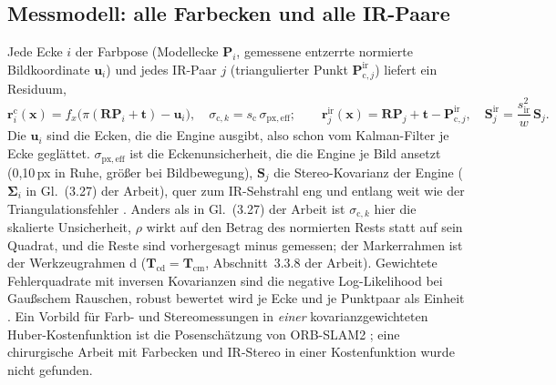 \documentclass[11pt,a4paper,fleqn]{article}
\newcommand{\Tcm}{\mathbf{T}_{\mathrm{cm}}}
\newcommand{\Pir}{\mathbf{P}^{\mathrm{ir}}_{\mathrm{c},j}}
\newcommand{\Sir}{\mathbf{S}^{\mathrm{ir}}_{j}}
\newcommand{\spx}{\sigma_{\mathrm{px,eff}}}
\begin{document}
\subsection{Messmodell: alle Farbecken und alle IR-Paare}

Jede Ecke $i$ der Farbpose (Modellecke $\mathbf{P}_i$, gemessene entzerrte normierte Bildkoordinate
$\mathbf{u}_i$) und jedes IR-Paar $j$ (triangulierter Punkt $\Pir$) liefert ein Residuum,
\begin{equation}
  \mathbf{r}^{\mathrm{c}}_i(\mathbf{x}) = f_x\bigl(\pi(\mathbf{R}\mathbf{P}_i + \mathbf{t}) - \mathbf{u}_i\bigr),
  \quad \sigma_{\mathrm{c},k} = s_{\mathrm{c}}\,\spx;
  \qquad
  \mathbf{r}^{\mathrm{ir}}_j(\mathbf{x}) = \mathbf{R}\mathbf{P}_j + \mathbf{t} - \Pir,
  \quad \Sir = \frac{s_{\mathrm{ir}}^2}{w}\,\mathbf{S}_j .
  \label{eq:meas}
\end{equation}
Die $\mathbf{u}_i$ sind die Ecken, die die Engine ausgibt, also schon vom Kalman-Filter je Ecke geglättet. $\spx$
ist die Eckenunsicherheit, die die Engine je Bild ansetzt (0,10\,px in Ruhe, größer bei Bildbewegung),
$\mathbf{S}_j$ die Stereo-Kovarianz der Engine ($\boldsymbol{\Sigma}_i$ in Gl.~(3.27) der Arbeit), quer zum
IR-Sehstrahl eng und entlang weit wie der Triangulationsfehler \cite[§II]{matthies1987error}. Anders als in
Gl.~(3.27) der Arbeit ist $\sigma_{\mathrm{c},k}$ hier die skalierte Unsicherheit, $\rho$ wirkt auf den Betrag des
normierten Rests statt auf sein Quadrat, und die Reste sind vorhergesagt minus gemessen; der Markerrahmen ist der
Werkzeugrahmen d ($\mathbf{T}_{\mathrm{cd}} = \Tcm$, Abschnitt~3.3.8 der Arbeit). Gewichtete
Fehlerquadrate mit inversen Kovarianzen sind die negative Log-Likelihood bei Gaußschem Rauschen, robust bewertet
wird je Ecke und je Punktpaar als Einheit \cite[§3.2--3.3]{triggs2000bundle}. Ein Vorbild für Farb- und
Stereomessungen in \emph{einer} kovarianzgewichteten Huber-Kostenfunktion ist die Posenschätzung von ORB-SLAM2
\cite[Abschn.~III-C]{murartal2017orbslam2}; eine chirurgische Arbeit mit Farbecken und IR-Stereo in einer
Kostenfunktion wurde nicht gefunden.
\end{document}
